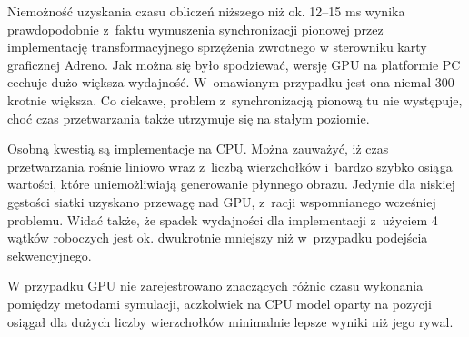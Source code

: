 		Niemożność uzyskania czasu obliczeń niższego niż ok. 12--15 ms wynika prawdopodobnie z~faktu wymuszenia synchronizacji pionowej przez implementację transformacyjnego sprzężenia zwrotnego w sterowniku karty graficznej Adreno. Jak można się było spodziewać, wersję GPU na platformie PC cechuje dużo większa wydajność. W~omawianym przypadku jest ona niemal 300-krotnie większa. Co ciekawe, problem z~synchronizacją pionową tu nie występuje, choć czas przetwarzania także utrzymuje się na stałym poziomie. 
		
		Osobną kwestią są implementacje na CPU. Można zauważyć, iż czas przetwarzania rośnie liniowo wraz z~liczbą wierzchołków i~bardzo szybko osiąga wartości, które uniemożliwiają generowanie płynnego obrazu. Jedynie dla niskiej gęstości siatki uzyskano przewagę nad GPU, z~racji wspomnianego wcześniej problemu. Widać także, że spadek wydajności dla implementacji z~użyciem 4 wątków roboczych jest ok. dwukrotnie mniejszy niż w~przypadku podejścia sekwencyjnego.
		
		W przypadku GPU nie zarejestrowano znaczących różnic czasu wykonania pomiędzy metodami symulacji, aczkolwiek na CPU model oparty na pozycji osiągał dla dużych liczby wierzchołków minimalnie lepsze wyniki niż jego rywal.
		
		
		
		
		
		
		
		
		
		
